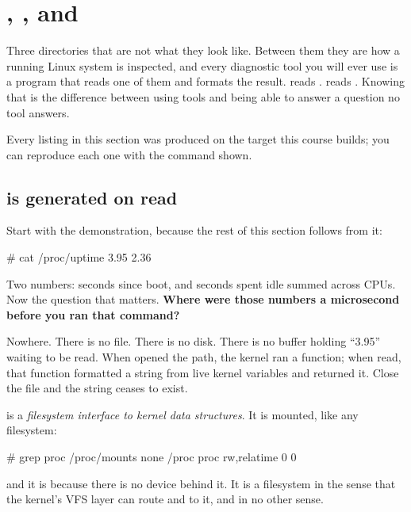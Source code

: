 
\section{, , and }
\label{c2:app:b}

Three directories that are not what they look like. Between them they are how a running Linux system
is inspected, and every diagnostic tool you will ever use is a program that reads one of them and
formats the result.  reads .  reads . Knowing that is
the difference between using tools and being able to answer a question no tool answers.

Every listing in this section was produced on the target this course builds; you can reproduce each
one with the command shown.

\subsection{ is generated on read}
\label{c2:app:b1}

Start with the demonstration, because the rest of this section follows from it:

\begin{console}
# cat /proc/uptime
3.95 2.36
\end{console}

\noindent Two numbers: seconds since boot, and seconds spent idle summed across CPUs. Now the
question that matters. \textbf{Where were those numbers a microsecond before you ran that command?}

Nowhere. There is no file. There is no disk. There is no buffer holding ``3.95'' waiting to be read.
When  opened the path, the kernel ran a function; when  read, that function
formatted a string from live kernel variables and returned it. Close the file and the string ceases
to exist.

 is a \emph{filesystem interface to kernel data structures}. It is mounted, like any
filesystem:

\begin{console}
# grep proc /proc/mounts
none /proc proc rw,relatime 0 0
\end{console}

\noindent and it is  because there is no device behind it. It is a filesystem in the
sense that the kernel's VFS layer can route  and  to it, and in no other
sense.

